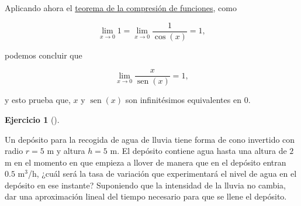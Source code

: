 \documentclass[
  a4paper,
]{scrreport}
\theoremstyle{definition}
\newtheorem{exercise}{Ejercicio}[chapter]
\theoremstyle{remark}
\begin{document}
\begin{tcolorbox}
Aplicando ahora el
\href{https://aprendeconalf.es/analisis-manual/06-limites.html\#thm-compresi\%C3\%B3n-funciones}{teorema
de la compresión de funciones}, como

\[
\lim_{x\to 0} 1 = \lim_{x\to 0} \frac{1}{\cos(x)} = 1,
\]

podemos concluir que

\[
\lim_{x\to 0} \frac{x}{\operatorname{sen}(x)} = 1,
\]

y esto prueba que, \(x\) y \(\operatorname{sen}(x)\) son infinitésimos
equivalentes en \(0\).

\end{tcolorbox}

\begin{exercise}[]\protect\hypertarget{exr-5}{}\label{exr-5}

Un depósito para la recogida de agua de lluvia tiene forma de cono
invertido con radio \(r=5\) m y altura \(h=5\) m. El depósito contiene
agua hasta una altura de \(2\) m en el momento en que empieza a llover
de manera que en el depósito entran \(0.5\) m\(^3\)/h, ¿cuál será la
tasa de variación que experimentará el nivel de agua en el depósito en
ese instante? Suponiendo que la intensidad de la lluvia no cambia, dar
una aproximación lineal del tiempo necesario para que se llene el
depósito.

\end{exercise}
\end{document}
